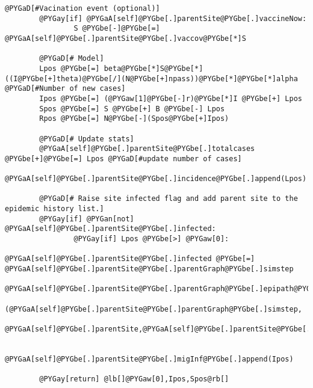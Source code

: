 \documentclass[a4paper,10pt]{manual}
\begin{document}
\begin{Verbatim}[commandchars=@\[\]]
        @PYGaD[#Vacination event (optional)]
        @PYGay[if] @PYGaA[self]@PYGbe[.]parentSite@PYGbe[.]vaccineNow:
                S @PYGbe[-]@PYGbe[=] @PYGaA[self]@PYGbe[.]parentSite@PYGbe[.]vaccov@PYGbe[*]S

        @PYGaD[# Model]
        Lpos @PYGbe[=] beta@PYGbe[*]S@PYGbe[*]((I@PYGbe[+]theta)@PYGbe[/](N@PYGbe[+]npass))@PYGbe[*]@PYGbe[*]alpha @PYGaD[#Number of new cases]
        Ipos @PYGbe[=] (@PYGaw[1]@PYGbe[-]r)@PYGbe[*]I @PYGbe[+] Lpos
        Spos @PYGbe[=] S @PYGbe[+] B @PYGbe[-] Lpos
        Rpos @PYGbe[=] N@PYGbe[-](Spos@PYGbe[+]Ipos)

        @PYGaD[# Update stats]
        @PYGaA[self]@PYGbe[.]parentSite@PYGbe[.]totalcases @PYGbe[+]@PYGbe[=] Lpos @PYGaD[#update number of cases]
        @PYGaA[self]@PYGbe[.]parentSite@PYGbe[.]incidence@PYGbe[.]append(Lpos)

        @PYGaD[# Raise site infected flag and add parent site to the epidemic history list.]
        @PYGay[if] @PYGan[not] @PYGaA[self]@PYGbe[.]parentSite@PYGbe[.]infected:
                @PYGay[if] Lpos @PYGbe[>] @PYGaw[0]:
                        @PYGaA[self]@PYGbe[.]parentSite@PYGbe[.]infected @PYGbe[=] @PYGaA[self]@PYGbe[.]parentSite@PYGbe[.]parentGraph@PYGbe[.]simstep
                        @PYGaA[self]@PYGbe[.]parentSite@PYGbe[.]parentGraph@PYGbe[.]epipath@PYGbe[.]append(
                        (@PYGaA[self]@PYGbe[.]parentSite@PYGbe[.]parentGraph@PYGbe[.]simstep,
                        @PYGaA[self]@PYGbe[.]parentSite,@PYGaA[self]@PYGbe[.]parentSite@PYGbe[.]infector))

        @PYGaA[self]@PYGbe[.]parentSite@PYGbe[.]migInf@PYGbe[.]append(Ipos)

        @PYGay[return] @lb[]@PYGaw[0],Ipos,Spos@rb[]
\end{Verbatim}
\end{document}
